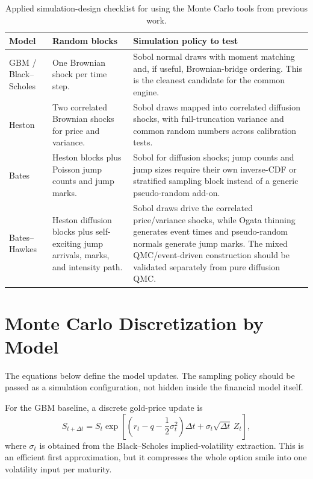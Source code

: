 \documentclass[a4paper,10pt,titlepage,oneside,openany]{book}
\theoremstyle{plain}
\theoremstyle{definition}
\theoremstyle{remark}
\begin{document}
\begin{table}[H]
\centering
\footnotesize
\setlength{\tabcolsep}{3.0pt}
\begin{tabularx}{\textwidth}{@{}>{\RaggedRight\arraybackslash}p{2.4cm}>{\RaggedRight\arraybackslash}p{4.2cm}>{\RaggedRight\arraybackslash}X@{}}
\toprule
\textbf{Model} & \textbf{Random blocks} & \textbf{Simulation policy to test} \\
\midrule
GBM / Black--Scholes & One Brownian shock per time step. & Sobol normal draws with moment matching and, if useful, Brownian-bridge ordering. This is the cleanest candidate for the common engine. \\
Heston & Two correlated Brownian shocks for price and variance. & Sobol draws mapped into correlated diffusion shocks, with full-truncation variance and common random numbers across calibration tests. \\
Bates & Heston blocks plus Poisson jump counts and jump marks. & Sobol for diffusion shocks; jump counts and jump sizes require their own inverse-CDF or stratified sampling block instead of a generic pseudo-random add-on. \\
Bates--Hawkes & Heston diffusion blocks plus self-exciting jump arrivals, marks, and intensity path. & Sobol draws drive the correlated price/variance shocks, while Ogata thinning generates event times and pseudo-random normals generate jump marks. The mixed QMC/event-driven construction should be validated separately from pure diffusion QMC. \\
\bottomrule
\end{tabularx}
\caption{Applied simulation-design checklist for using the Monte Carlo tools from previous work.}
\label{tab:simulation-design}
\end{table}

\section{Monte Carlo Discretization by Model}

The equations below define the model updates. The sampling policy should be passed as a simulation configuration, not hidden inside the financial model itself.

For the GBM baseline, a discrete gold-price update is
\begin{equation}
    S_{t+\Delta t}
    =
    S_t
    \exp\left[
        \left(r_t-q-\frac{1}{2}\sigma_t^2\right)\Delta t
        + \sigma_t\sqrt{\Delta t}\,Z_t
    \right],
    \label{eq:gbm-path}
\end{equation}
where \(\sigma_t\) is obtained from the Black--Scholes implied-volatility extraction. This is an efficient first approximation, but it compresses the whole option smile into one volatility input per maturity.
\end{document}

